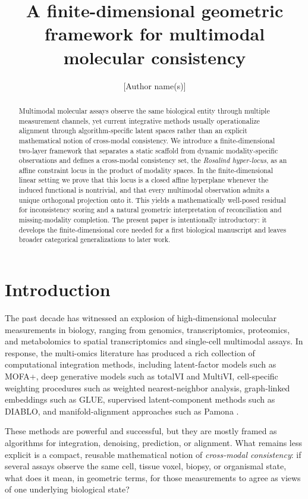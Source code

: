 \documentclass[11pt]{article}
\title{A finite-dimensional geometric framework for multimodal molecular consistency}
\author{[Author name(s)]}
\date{}
\begin{document}
\maketitle

\begin{abstract}
Multimodal molecular assays observe the same biological entity through multiple measurement channels, yet current integrative methods usually operationalize alignment through algorithm-specific latent spaces rather than an explicit mathematical notion of cross-modal consistency. We introduce a finite-dimensional two-layer framework that separates a static scaffold from dynamic modality-specific observations and defines a cross-modal consistency set, the \emph{Rosalind hyper-locus}, as an affine constraint locus in the product of modality spaces. In the finite-dimensional linear setting we prove that this locus is a closed affine hyperplane whenever the induced functional is nontrivial, and that every multimodal observation admits a unique orthogonal projection onto it. This yields a mathematically well-posed residual for inconsistency scoring and a natural geometric interpretation of reconciliation and missing-modality completion. The present paper is intentionally introductory: it develops the finite-dimensional core needed for a first biological manuscript and leaves broader categorical generalizations to later work.
\end{abstract}

\section{Introduction}

The past decade has witnessed an explosion of high-dimensional molecular measurements in biology, ranging from genomics, transcriptomics, proteomics, and metabolomics to spatial transcriptomics and single-cell multimodal assays. In response, the multi-omics literature has produced a rich collection of computational integration methods, including latent-factor models such as MOFA+, deep generative models such as totalVI and MultiVI, cell-specific weighting procedures such as weighted nearest-neighbor analysis, graph-linked embeddings such as GLUE, supervised latent-component methods such as DIABLO, and manifold-alignment approaches such as Pamona \cite{Argelaguet2020,Gayoso2021,Ashuach2023,Hao2021,Cao2022,Singh2019,CaoHong2022}.

These methods are powerful and successful, but they are mostly framed as algorithms for integration, denoising, prediction, or alignment. What remains less explicit is a compact, reusable mathematical notion of \emph{cross-modal consistency}: if several assays observe the same cell, tissue voxel, biopsy, or organismal state, what does it mean, in geometric terms, for those measurements to agree as views of one underlying biological state?
\end{document}
